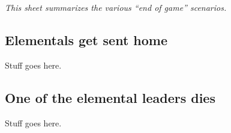 \documentclass[green]{elementals}
\begin{document}
\name{\gEndGame{}}

\emph{This sheet summarizes the various ``end of game'' scenarios.}

\subsection{Elementals get sent home}

Stuff goes here.

\subsection{One of the elemental leaders dies}

Stuff goes here.
\end{document}
